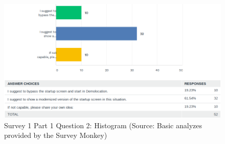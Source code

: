 \documentclass[a4paper,10pt,twoside]{article}
\begin{document}
\vspace{0.3cm}
\begin{figure}[hbt!] 
\begin{center}
\includegraphics[width=17cm]{../surveys/analyzed_data/survey1_part1_question2_histogram_sm.png} 
\caption[Survey 1 Part 1 Question 2: Histogram]{Survey 1 Part 1 Question 2: Histogram (Source: Basic analyzes provided by the Survey Monkey)}
\label{fig:survey1_part1_question2_histogram_sm}
\end{center}
\end{figure}
\end{document}
